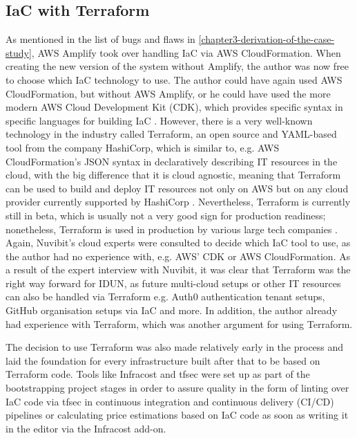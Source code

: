 \subsection{IaC with Terraform}
\label{chapter4-iac-with-terraform}

As mentioned in the list of bugs and flaws in \autoref{chapter3-derivation-of-the-case-study}, AWS Amplify took over handling IaC via AWS CloudFormation. When creating the new version of the system without Amplify, the author was now free to choose which IaC technology to use. The author could have again used AWS CloudFormation, but without AWS Amplify, or he could have used the more modern AWS Cloud Development Kit (CDK), which provides specific syntax in specific languages for building IaC \citep{aws_aws_nodate}. However, there is a very well-known technology in the industry called Terraform, an open source and YAML-based tool from the company HashiCorp, which is similar to, e.g. AWS CloudFormation's JSON syntax in declaratively describing IT resources in the cloud, with the big difference that it is cloud agnostic, meaning that Terraform can be used to build and deploy IT resources not only on AWS but on any cloud provider currently supported by HashiCorp \citep{hashicorp_browse_nodate}. Nevertheless, Terraform is currently still in beta, which is usually not a very good sign for production readiness; nonetheless, Terraform is used in production by various large tech companies \citep{stackshare_why_nodate}. Again, Nuvibit's cloud experts were consulted to decide which IaC tool to use, as the author had no experience with, e.g. AWS' CDK or AWS CloudFormation. As a result of the expert interview with Nuvibit, it was clear that Terraform was the right way forward for IDUN, as future multi-cloud setups or other IT resources can also be handled via Terraform e.g. Auth0 authentication tenant setups, GitHub organisation setups via IaC and more. In addition, the author already had experience with Terraform, which was another argument for using Terraform.

The decision to use Terraform was also made relatively early in the process and laid the foundation for every infrastructure built after that to be based on Terraform code. Tools like Infracost and tfsec were set up as part of the bootstrapping project stages in order to assure quality in the form of linting over IaC code via tfsec in continuous integration and continuous delivery (CI/CD) pipelines or calculating price estimations based on IaC code as soon as writing it in the editor via the Infracost add-on.

